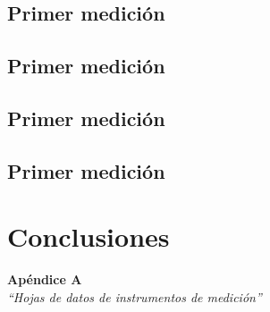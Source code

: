 \documentclass{article}
\begin{document}
\subsection{Primer medición}


\subsection{Primer medición}


\subsection{Primer medición}


\subsection{Primer medición}


\section{Conclusiones}

	
\bigskip\bigskip


\newpage \textit{}
\newpage



\newpage
\vspace*{4cm}
\begin{center}
	\textbf{\Huge{Apéndice A}} \\
	\bigskip\bigskip
	\Large{\textit{``Hojas de datos de instrumentos de medición''}}
\end{center}


\newpage \textit{}
\newpage
\end{document}
